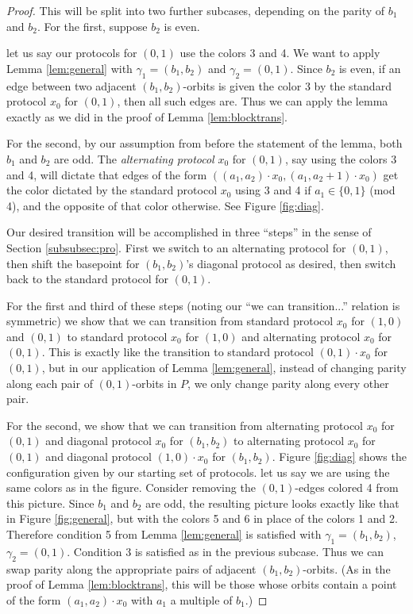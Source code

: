 \documentclass[10pt,a4paper]{article}
\newcommand{\0}{\varnothing}
\begin{document}
\begin{proof}
This will be split into two further subcases, depending on the parity of $b_1$ and $b_2$. For the first, suppose $b_2$ is even.

let us say our protocols for $(0,1)$ use the colors 3 and 4. We want to apply Lemma \ref{lem:general} with $\gamma_1 = (b_1,b_2)$ and $\gamma_2 = (0,1)$. Since $b_2$ is even, if an edge between two adjacent $(b_1,b_2)$-orbits is given the color 3 by the standard protocol $x_0$ for $(0,1)$, then all such edges are. Thus we can apply the lemma exactly as we did in the proof of Lemma \ref{lem:blocktrans}.

For the second, by our assumption from before the statement of the lemma, both $b_1$ and $b_2$ are odd. The \textit{alternating protocol} $x_0$ for $(0,1)$, say using the colors 3 and 4, will dictate that edges of the form $((a_1,a_2) \cdot x_0, (a_1,a_2+1) \cdot x_0)$ get the color dictated by the standard protocol $x_0$ using 3 and 4 if $a_1 \in \{0,1\}$ (mod 4), and the opposite of that color otherwise. See Figure \ref{fig:diag}. 

Our desired transition will be accomplished in three ``steps'' in the sense of Section \ref{subsubsec:pro}. First we switch to an alternating protocol for $(0,1)$, then shift the basepoint for $(b_1,b_2)$'s diagonal protocol as desired, then switch back to the standard protocol for $(0,1)$.

For the first and third of these steps (noting our ``we can transition...'' relation is symmetric) we show that we can transition from standard protocol $x_0$ for $(1,0)$ and $(0,1)$ to standard protocol $x_0$ for $(1,0)$ and alternating protocol $x_0$ for $(0,1)$. This is exactly like the transition to standard protocol $(0,1) \cdot x_0$ for $(0,1)$, but in our application of Lemma \ref{lem:general}, instead of changing parity along each pair of $(0,1)$-orbits in $P$, we only change parity along every other pair.

For the second, we show that we can transition from alternating protocol $x_0$ for $(0,1)$ and diagonal protocol $x_0$ for $(b_1,b_2)$ to alternating protocol $x_0$ for $(0,1)$ and diagonal protocol $(1,0) \cdot x_0$ for $(b_1,b_2)$. Figure \ref{fig:diag} shows the configuration given by our starting set of protocols. let us say we are using the same colors as in the figure. Consider removing the $(0,1)$-edges colored 4 from this picture. Since $b_1$ and $b_2$ are odd, the resulting picture looks exactly like that in Figure \ref{fig:general}, but with the colors 5 and 6 in place of the colors 1 and 2. Therefore condition 5 from Lemma \ref{lem:general} is satisfied with $\gamma_1 = (b_1,b_2)$, $\gamma_2 = (0,1)$. Condition 3 is satisfied as in the previous subcase. Thus we can swap parity along the appropriate pairs of adjacent $(b_1,b_2)$-orbits. (As in the proof of Lemma \ref{lem:blocktrans}, this will be those whose orbits contain a point of the form $(a_1,a_2) \cdot x_0$ with $a_1$ a multiple of $b_1$.)
\end{proof}
\end{document}
